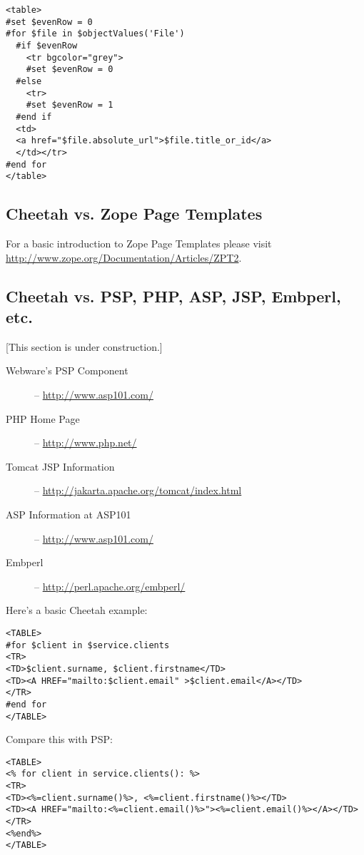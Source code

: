 \begin{verbatim}
<table>
#set $evenRow = 0
#for $file in $objectValues('File')
  #if $evenRow
    <tr bgcolor="grey">
    #set $evenRow = 0
  #else
    <tr>
    #set $evenRow = 1
  #end if
  <td>
  <a href="$file.absolute_url">$file.title_or_id</a>
  </td></tr>
#end for
</table>
\end{verbatim}

\subsection{Cheetah vs. Zope Page Templates}
\label{comparisons.zpt}

For a basic introduction to Zope Page Templates please visit
\url{http://www.zope.org/Documentation/Articles/ZPT2}.

\subsection{Cheetah vs. PSP, PHP, ASP, JSP, Embperl, etc.}
\label{comparisons.pspEtc}

[This section is under construction.]

\begin{description}
\item[Webware's PSP Component] -- \url{http://www.asp101.com/}
\item[PHP Home Page] -- \url{http://www.php.net/}
\item[Tomcat JSP Information] -- \url{http://jakarta.apache.org/tomcat/index.html}
\item[ASP Information at ASP101] -- \url{http://www.asp101.com/}
\item[Embperl] -- \url{http://perl.apache.org/embperl/}
\end{description}


Here's a basic Cheetah example:
\begin{verbatim}
<TABLE>
#for $client in $service.clients
<TR>
<TD>$client.surname, $client.firstname</TD>
<TD><A HREF="mailto:$client.email" >$client.email</A></TD>
</TR>
#end for
</TABLE>
\end{verbatim}

Compare this with PSP:

\begin{verbatim}
<TABLE>
<% for client in service.clients(): %>
<TR>
<TD><%=client.surname()%>, <%=client.firstname()%></TD>
<TD><A HREF="mailto:<%=client.email()%>"><%=client.email()%></A></TD>
</TR>
<%end%>
</TABLE>
\end{verbatim}


